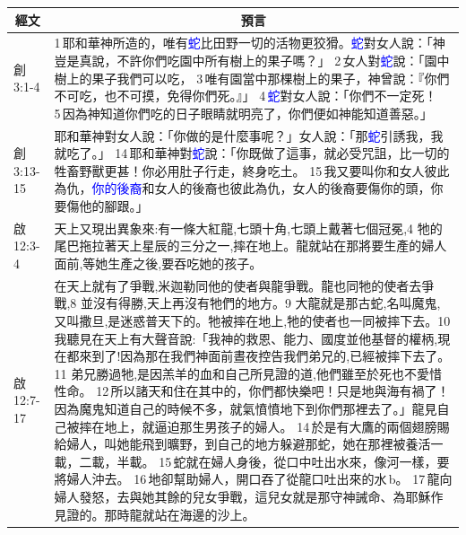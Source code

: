 \begin{table}[H]
\centering
\begin{tabular}{p{1.5cm}|p{}}\hline\hline
  \multicolumn{1}{c|}{經文}&\multicolumn{1}{c}{預言}\\\hline
創3:1-4&1 耶和華神所造的，唯有\textcolor{blue}{蛇}比田野一切的活物更狡猾。\textcolor{blue}{蛇}對女人說：「神豈是真說，不許你們吃園中所有樹上的果子嗎？」 2 女人對\textcolor{blue}{蛇}說：「園中樹上的果子我們可以吃， 3 唯有園當中那棵樹上的果子，神曾說：『你們不可吃，也不可摸，免得你們死。』」 4 \textcolor{blue}{蛇}對女人說：「你們不一定死！ 5 因為神知道你們吃的日子眼睛就明亮了，你們便如神能知道善惡。」\\\hline

創3:13-15&耶和華神對女人說：「你做的是什麼事呢？」女人說：「那\textcolor{blue}{蛇}引誘我，我就吃了。」 14 耶和華神對\textcolor{blue}{蛇}說：「你既做了這事，就必受咒詛，比一切的牲畜野獸更甚！你必用肚子行走，終身吃土。 15 我又要叫你和女人彼此為仇，\textcolor{blue}{你的後裔}和女人的後裔也彼此為仇，女人的後裔要傷你的頭，你要傷他的腳跟。」\\\hline
啟12:3-4&天上又現出異象來:有一條大紅龍,七頭十角,七頭上戴著七個冠冕,4 牠的尾巴拖拉著天上星辰的三分之一,摔在地上。龍就站在那將要生產的婦人面前,等她生產之後,要吞吃她的孩子。\\\hline
啟12:7-17& 在天上就有了爭戰,米迦勒同他的使者與龍爭戰。龍也同牠的使者去爭戰,8 並沒有得勝,天上再沒有牠們的地方。9 大龍就是那古蛇,名叫魔鬼,又叫撒旦,是迷惑普天下的。牠被摔在地上,牠的使者也一同被摔下去。10 我聽見在天上有大聲音說:「我神的救恩、能力、國度並他基督的權柄,現在都來到了!因為那在我們神面前晝夜控告我們弟兄的,已經被摔下去了。11 弟兄勝過牠,是因羔羊的血和自己所見證的道,他們雖至於死也不愛惜性命。 12 所以諸天和住在其中的，你們都快樂吧！只是地與海有禍了！因為魔鬼知道自己的時候不多，就氣憤憤地下到你們那裡去了。」龍見自己被摔在地上，就逼迫那生男孩子的婦人。 14 於是有大鷹的兩個翅膀賜給婦人，叫她能飛到曠野，到自己的地方躲避那蛇，她在那裡被養活一載，二載，半載。 15 蛇就在婦人身後，從口中吐出水來，像河一樣，要將婦人沖去。 16 地卻幫助婦人，開口吞了從龍口吐出來的水 b。 17 龍向婦人發怒，去與她其餘的兒女爭戰，這兒女就是那守神誡命、為耶穌作見證的。那時龍就站在海邊的沙上。\\\hline
\end{tabular}
\end{table}


